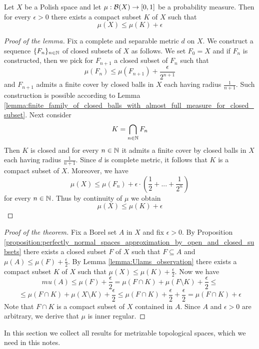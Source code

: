 \begin{lemma}\label{lemma:Ulams_observation}
Let $X$ be a Polish space and let $\mu:{\mathcal B}(X)\rightarrow [0,1]$ be a probability measure. Then for every $\epsilon > 0$ there exists a compact subset $K$ of $X$ such that
$$\mu(X)\leq \mu(K) + \epsilon$$
\end{lemma}
\begin{proof}[Proof of the lemma]
Fix a complete and separable metric $d$ on $X$. We construct a sequence $\{F_n\}_{n\in {\mathbb N}}$ of closed subsets of $X$ as follows. We set $F_0 = X$ and if $F_n$ is constructed, then we pick for $F_{n+1}$ a closed subset of $F_n$ such that
$$\mu(F_{n})\leq \mu(F_{n+1}) + \frac{\epsilon}{2^{n+1}}$$
and $F_{n+1}$ admits a finite cover by closed balls in $X$ each having radius $\frac{1}{n+1}$. Such construction is possible according to Lemma \ref{lemma:finite_family_of_closed_balls_with_almost_full_measure_for_closed_subset}. Next consider 
$$K = \bigcap_{n\in {\mathbb N}}F_n$$
Then $K$ is closed and for every $n\in {\mathbb N}$ it admits a finite cover by closed balls in $X$ each having radius $\frac{1}{n+1}$. Since $d$ is complete metric, it follows that $K$ is a compact subset of $X$. Moreover, we have
$$\mu(X) \leq \mu(F_n) + \epsilon\cdot \left(\frac{1}{2} + ... + \frac{1}{2^{n}}\right)$$
for every $n\in {\mathbb N}$. Thus by continuity of $\mu$ we obtain
$$\mu(X) \leq \mu(K) + \epsilon$$
\end{proof}

\begin{proof}[Proof of the theorem]
Fix a Borel set $A$ in $X$ and fix $\epsilon > 0$. By Proposition \ref{proposition:perfectly_normal_spaces_approximation_by_open_and_closed_subsets} there exists a closed subset $F$ of $X$ such that $F\subseteq A$ and $\mu(A) \leq \mu(F) + \frac{\epsilon}{2}$. By Lemma \ref{lemma:Ulams_observation} there exists a compact subset $K$ of $X$ such that $\mu(X) \leq \mu(K) + \frac{\epsilon}{2}$. Now we have
$$mu\left(A\right) \leq \mu(F) + \frac{\epsilon}{2} = \mu(F\cap K) + \mu(F\setminus K) + \frac{\epsilon}{2} \leq$$
$$\leq \mu(F\cap K) + \mu(X\setminus K) + \frac{\epsilon}{2}  \leq \mu(F\cap K) + \frac{\epsilon}{2} +  \frac{\epsilon}{2} = \mu(F\cap K) + \epsilon$$
Note that $F\cap K$ is a compact subset of $X$ contained in $A$. Since $A$ and $\epsilon > 0$ are arbitrary, we derive that $\mu$ is inner regular.
\end{proof}


\noindent
In this section we collect all results for metrizable topological spaces, which we need in this notes.

